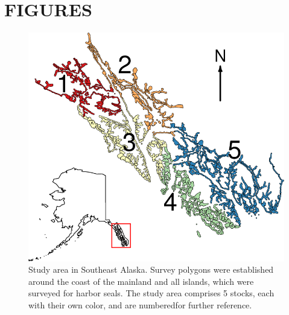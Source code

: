 \documentclass[11pt, titlepage]{article}\usepackage[]{graphicx}\usepackage[]{color}
\begin{document}

\clearpage


\section*{FIGURES}



\begin{figure}[H]
  \begin{center}
  \includegraphics[width=\linewidth]{figure/Fig-Stocks.png}
  \end{center}
  \caption{Study area in Southeast Alaska.  Survey polygons were established around the coast of the mainland and all islands, which were surveyed for harbor seals.  The study area comprises 5 stocks, each with their own color, and are numberedfor further reference.  \label{Fig-Stocks}}         
\end{figure}
\end{document}
